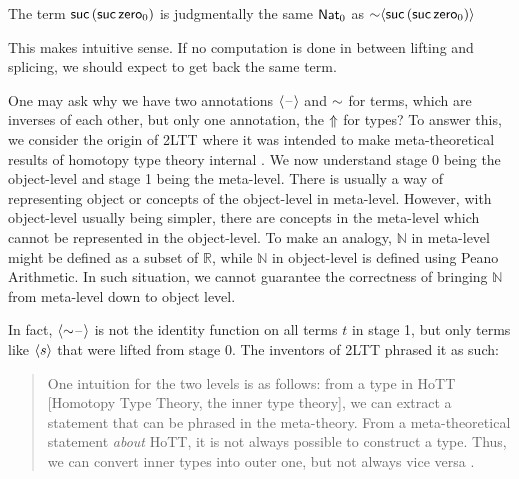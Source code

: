 \begin{example}[Elimination]
    The term $\mathsf{suc}\,(\mathsf{suc}\,\mathsf{zero}_0)$ is judgmentally the same $\mathsf{Nat}_0$ as ${\sim} \langle \mathsf{suc}\,(\mathsf{suc}\,\mathsf{zero}_0)\rangle$
\end{example}

This makes intuitive sense. If no computation is done in between lifting and splicing, we should expect to get back the same term. 


             



One may ask why we have two annotations $\langle {\mathord{\hspace{1pt}\text{--}\hspace{1pt}}}\rangle$ and ${\sim}$ for terms, which are inverses of each other, but only one annotation, the ${\Uparrow}$ for types? To answer this, we consider the origin of 2LTT where it was intended to make meta-theoretical results of homotopy type theory internal \cite{2ltt}. We now understand stage 0 being the object-level and stage 1 being the meta-level. There is usually a way of representing object or concepts of the object-level in meta-level. However, with object-level usually being simpler, there are concepts in the meta-level which cannot be represented in the object-level. To make an analogy, $\mathbb N$ in meta-level might be defined as a subset of $\mathbb R$, while $\mathbb N$ in object-level is defined using Peano Arithmetic. In such situation, we cannot guarantee the correctness of bringing $\mathbb N$ from meta-level down to object level. 

In fact, $\langle {\sim} {\mathord{\hspace{1pt}\text{--}\hspace{1pt}}}\rangle$ is not the identity function on all terms $t$ in stage 1, but only terms like $\langle s\rangle$ that were lifted from stage 0. The inventors of 2LTT phrased it as such:
\begin{quote}
    One intuition for the two levels is as follows: from a type in HoTT [Homotopy Type Theory, the inner type theory], we can extract a statement that can be phrased in the meta-theory. From a meta-theoretical statement \emph{about} HoTT, it is not always possible to construct a type. Thus, we can convert inner types into outer one, but not always vice versa \cite{2ltt}.
\end{quote}